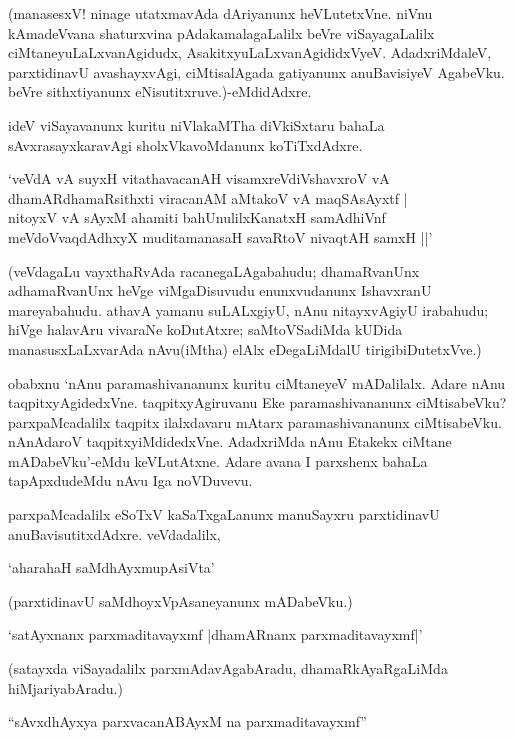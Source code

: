 (manasesxV! ninage utatxmavAda dAriyanunx heVLutetxVne. niVnu kAmadeVvana shaturxvina pAdakamalagaLalilx beVre viSayagaLalilx ciMtaneyuLaLxvanAgidudx, AsakitxyuLaLxvanAgididxVyeV. AdadxriMdaleV, parxtidinavU avashayxvAgi, ciMtisalAgada gatiyanunx anuBavisiyeV AgabeVku. beVre sithxtiyanunx eNisutitxruve.)-eMdidAdxre.

ideV viSayavanunx kuritu niVlakaMTha diVkiSxtaru bahaLa sAvxrasayxkaravAgi sholxVkavoMdanunx koTiTxdAdxre.

\begin{shloka}
`veVdA vA suyxH vitathavacanAH visamxreVdiVshavxroV vA\\
dhamARdhamaRsithxti viracanAM aMtakoV vA maqSAsAyxtf |\\
nitoyxV vA sAyxM ahamiti bahUnulilxKanatxH samAdhiVnf\\
meVdoVvaqdAdhxyX muditamanasaH savaRtoV nivaqtAH samxH ||'
\end{shloka}

(veVdagaLu vayxthaRvAda racanegaLAgabahudu; dhamaRvanUnx adhamaRvanUnx heVge viMgaDisuvudu enunxvudanunx IshavxranU mareyabahudu. athavA yamanu suLALxgiyU, nAnu nitayxvAgiyU irabahudu; hiVge halavAru vivaraNe koDutAtxre; saMtoVSadiMda kUDida manasusxLaLxvarAda nAvu(iMtha) elAlx eDegaLiMdalU tirigibiDutetxVve.)

obabxnu `nAnu paramashivananunx kuritu ciMtaneyeV mADalilalx. Adare nAnu taqpitxyAgidedxVne. taqpitxyAgiruvanu Eke paramashivananunx ciMtisabeVku? parxpaMcadalilx taqpitx ilalxdavaru mAtarx paramashivananunx ciMtisabeVku. nAnAdaroV taqpitxyiMdidedxVne. AdadxriMda nAnu Etakekx ciMtane mADabeVku'-eMdu keVLutAtxne. Adare avana I parxshenx bahaLa tapApxdudeMdu nAvu Iga noVDuvevu.

parxpaMcadalilx eSoTxV kaSaTxgaLanunx manuSayxru parxtidinavU anuBavisutitxdAdxre. veVdadalilx,

\begin{shloka}
`aharahaH saMdhAyxmupAsiVta'
\end{shloka}

(parxtidinavU saMdhoyxVpAsaneyanunx mADabeVku.)

\begin{shloka}
`satAyxnanx parxmaditavayxmf |dhamARnanx parxmaditavayxmf|'
\end{shloka}

(satayxda viSayadalilx parxmAdavAgabAradu, dhamaRkAyaRgaLiMda hiMjariyabAradu.)

\begin{shloka}
``sAvxdhAyxya parxvacanABAyxM na parxmaditavayxmf''
\end{shloka}

